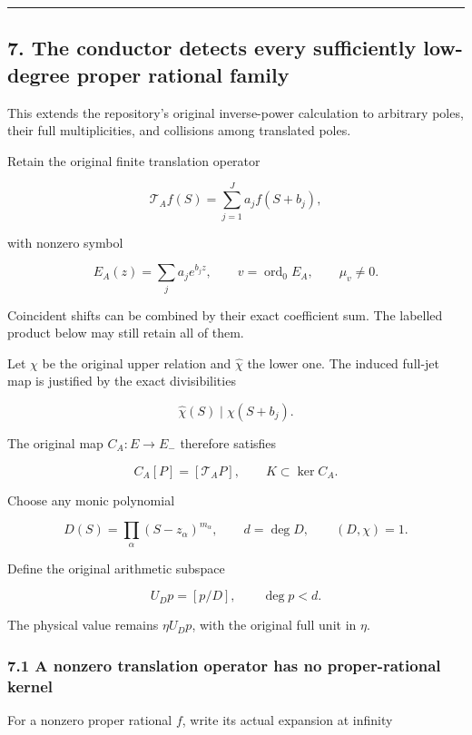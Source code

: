 \documentclass[11pt]{article}
\begin{document}
\begin{center}\rule{0.5\linewidth}{0.5pt}\end{center}

\subsection{7. The conductor detects every sufficiently low-degree proper rational family}\label{the-conductor-detects-every-sufficiently-low-degree-proper-rational-family}

This extends the repository's original inverse-power calculation to arbitrary poles, their full multiplicities, and collisions among translated poles.

Retain the original finite translation operator

\[
\mathcal T_Af(S)=\sum_{j=1}^{J}a_jf(S+b_j),
\]

with nonzero symbol

\[
E_A(z)=\sum_ja_je^{b_jz},
\qquad
v=\operatorname{ord}_0E_A,
\qquad
\mu_v\ne0.
\]

Coincident shifts can be combined by their exact coefficient sum. The labelled product below may still retain all of them.

Let \(\chi\) be the original upper relation and \(\widehat\chi\) the lower one. The induced full-jet map is justified by the exact divisibilities

\[
\widehat\chi(S)\mid\chi(S+b_j).
\tag{52}
\]

The original map \(C_A:E\to E_-\) therefore satisfies

\[
C_A[P]=[\mathcal T_AP],
\qquad K\subset\ker C_A.
\]

Choose any monic polynomial

\[
D(S)=\prod_\alpha(S-z_\alpha)^{m_\alpha},
\qquad d=\deg D,
\qquad (D,\chi)=1.
\]

Define the original arithmetic subspace

\[
\boxed{
U_Dp=[p/D],
\qquad \deg p<d.
}
\tag{53}
\]

The physical value remains \(\eta U_Dp\), with the original full unit in \(\eta\).

\subsubsection{7.1 A nonzero translation operator has no proper-rational kernel}\label{a-nonzero-translation-operator-has-no-proper-rational-kernel}

For a nonzero proper rational \(f\), write its actual expansion at infinity
\end{document}
